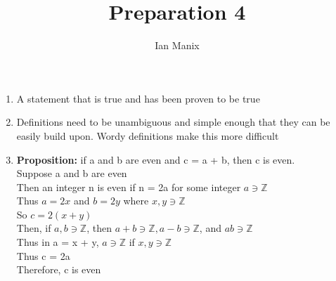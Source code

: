 \documentclass[sigconf]{article}
\title{
  \textbf{Preparation 4} \\
  }
\author{ 
  Ian Manix
  }
\begin{document}



\maketitle





\begin{enumerate}
  \item A statement that is true and has been proven to be true
  \item Definitions need to be unambiguous and simple enough that they can be easily build upon. Wordy definitions make this more difficult
  \item \textbf{Proposition:} if a and b are even and c = a + b, then c is even.\\
        Suppose a and b are even \\
        Then an integer n is even if n = 2a for some integer $a \ni \mathbb{Z}$\\
        Thus $a = 2x$ and $b = 2y$ where $x,y \ni \mathbb{Z}$\\
        So $c = 2(x+y)$\\
        Then, if $a,b \ni \mathbb{Z}$, then $a+b \ni \mathbb{Z}, a - b \ni \mathbb{Z}$, and $ab \ni \mathbb{Z}$\\
        Thus in a = x + y, $a \ni \mathbb{Z}$ if $x,y \ni \mathbb{Z}$\\
        Thus c = 2a \\
        Therefore, c is even
\end{enumerate}



\end{document}
